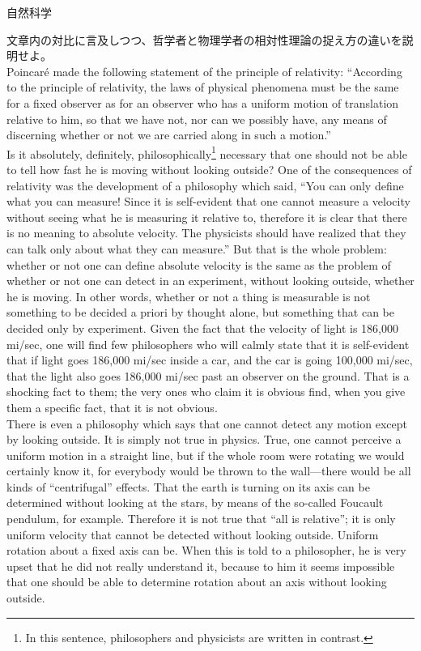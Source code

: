 \documentclass[b4paper,fleqn,dvipdfmx]{jsarticle}
\begin{document}
\begin{itembox}[l]{自然科学}

文章内の対比に言及しつつ、哲学者と物理学者の相対性理論の捉え方の違いを説明せよ。\\
Poincaré made the following statement of the principle of relativity: “According to the principle of relativity, the laws of physical phenomena must be the same for a fixed observer as for an observer who has a uniform motion of translation relative to him, so that we have not, nor can we possibly have, any means of discerning whether or not we are carried along in such a motion.”\\
Is it absolutely, definitely, philosophically\footnote{In this sentence, philosophers and physicists are written in contrast.} necessary that one should not be able to tell how fast he is moving without looking outside? One of the consequences of relativity was the development of a philosophy which said, “You can only define what you can measure! Since it is self-evident that one cannot measure a velocity without seeing what he is measuring it relative to, therefore it is clear that there is no meaning to absolute velocity. The physicists should have realized that they can talk only about what they can measure.” But that is the whole problem: whether or not one can define absolute velocity is the same as the problem of whether or not one can detect in an experiment, without looking outside, whether he is moving. In other words, whether or not a thing is measurable is not something to be decided a priori by thought alone, but something that can be decided only by experiment. Given the fact that the velocity of light is 186,000 mi/sec, one will find few philosophers who will calmly state that it is self-evident that if light goes 186,000 mi/sec inside a car, and the car is going 100,000 mi/sec, that the light also goes 186,000 mi/sec past an observer on the ground. That is a shocking fact to them; the very ones who claim it is obvious find, when you give them a specific fact, that it is not obvious.\\
There is even a philosophy which says that one cannot detect any motion except by looking outside. It is simply not true in physics. True, one cannot perceive a uniform motion in a straight line, but if the whole room were rotating we would certainly know it, for everybody would be thrown to the wall—there would be all kinds of “centrifugal” effects. That the earth is turning on its axis can be determined without looking at the stars, by means of the so-called Foucault pendulum, for example. Therefore it is not true that “all is relative”; it is only uniform velocity that cannot be detected without looking outside. Uniform rotation about a fixed axis can be. When this is told to a philosopher, he is very upset that he did not really understand it, because to him it seems impossible that one should be able to determine rotation about an axis without looking outside.

\end{itembox}
\end{document}
